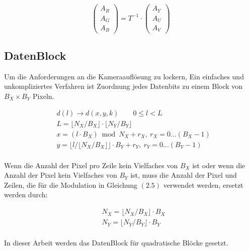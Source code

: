 \begin{equation}
   \begin{pmatrix}
   A_R \\
   A_G \\
   A_B
  \end{pmatrix}  = T^{-1} \cdot \begin{pmatrix}
   A_Y \\
   A_U \\
   A_V
  \end{pmatrix}
\end{equation}



\subsection{DatenBlock}

Um die Anforderungen an die Kameraauflösung zu lockern, Ein einfaches und unkompliziertes Verfahren ist Zuordnung jedes Datenbits zu einem Block von $B_X \times B_Y$ Pixeln.

\begin{equation}
\begin{split}
  & d(l)\rightarrow d(x,y,k) \qquad 0\le l <L \\
  & L=\lfloor N_X/B_X \rfloor \cdot \lfloor N_Y/B_Y \rfloor \\
  & x=(l \cdot B_X) \bmod N_X +r_X, \ r_X =0...(B_X -1) \\
  & y=\lfloor l / \lfloor N_X/B_X \rfloor \rfloor \cdot B_Y +r_Y, \ r_Y =0...(B_Y -1) \\
\end{split}
\end{equation}

Wenn die Anzahl der Pixel pro Zeile kein Vielfaches von $B_X$ ist oder wenn die Anzahl der Pixel kein Vielfaches von $B_Y$ ist, muss die Anzahl der Pixel und Zeilen, die für die Modulation in Gleichung $\left(2.5\right)$ verwendet werden, ersetzt werden durch:

\begin{equation}
\begin{split}
  & N_X = \lfloor N_X/B_X \rfloor \cdot B_X\\ 
  & N_Y = \lfloor N_Y/B_Y \rfloor \cdot B_Y\\ 
\end{split}
\end{equation}

In dieser Arbeit werden das DatenBlock für quadratische Blöcke gesetzt.

